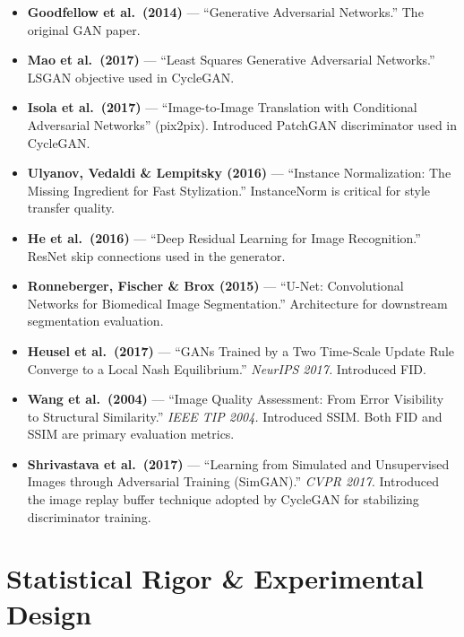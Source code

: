 \documentclass[11pt,a4paper]{article}
\theoremstyle{definition}
\begin{document}
\begin{itemize}
    \item \textbf{Goodfellow et al.\ (2014)} --- ``Generative Adversarial Networks.'' The original GAN paper.

    \item \textbf{Mao et al.\ (2017)} --- ``Least Squares Generative Adversarial Networks.'' LSGAN objective used in CycleGAN.

    \item \textbf{Isola et al.\ (2017)} --- ``Image-to-Image Translation with Conditional Adversarial Networks'' (pix2pix). Introduced PatchGAN discriminator used in CycleGAN.

    \item \textbf{Ulyanov, Vedaldi \& Lempitsky (2016)} --- ``Instance Normalization: The Missing Ingredient for Fast Stylization.'' InstanceNorm is critical for style transfer quality.

    \item \textbf{He et al.\ (2016)} --- ``Deep Residual Learning for Image Recognition.'' ResNet skip connections used in the generator.

    \item \textbf{Ronneberger, Fischer \& Brox (2015)} --- ``U-Net: Convolutional Networks for Biomedical Image Segmentation.'' Architecture for downstream segmentation evaluation.

    \item \textbf{Heusel et al.\ (2017)} --- ``GANs Trained by a Two Time-Scale Update Rule Converge to a Local Nash Equilibrium.'' \textit{NeurIPS 2017.} Introduced FID.

    \item \textbf{Wang et al.\ (2004)} --- ``Image Quality Assessment: From Error Visibility to Structural Similarity.'' \textit{IEEE TIP 2004.} Introduced SSIM. Both FID and SSIM are primary evaluation metrics.

    \item \textbf{Shrivastava et al.\ (2017)} --- ``Learning from Simulated and Unsupervised Images through Adversarial Training (SimGAN).'' \textit{CVPR 2017.} Introduced the image replay buffer technique adopted by CycleGAN for stabilizing discriminator training.
\end{itemize}

\section{Statistical Rigor \& Experimental Design}
\end{document}
